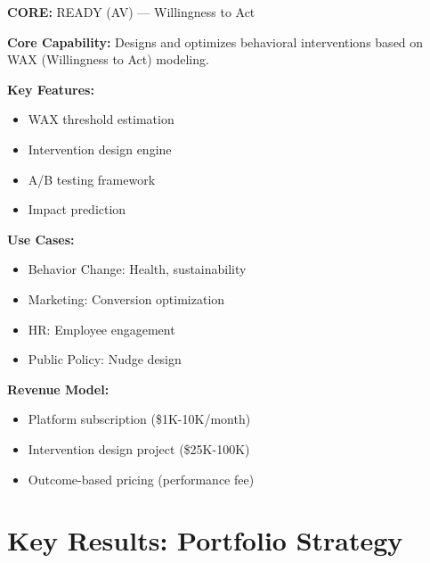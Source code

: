 \begin{tcolorbox}[colback=cyan!5!white, colframe=cyan!75!black,
    title=Product: Intervention Optimizer]

\textbf{CORE:} READY (AV) --- Willingness to Act

\textbf{Core Capability:}
Designs and optimizes behavioral interventions based on WAX (Willingness to Act) modeling.

\textbf{Key Features:}
\begin{itemize}[nosep]
\item WAX threshold estimation
\item Intervention design engine
\item A/B testing framework
\item Impact prediction
\end{itemize}

\textbf{Use Cases:}
\begin{itemize}[nosep]
\item Behavior Change: Health, sustainability
\item Marketing: Conversion optimization
\item HR: Employee engagement
\item Public Policy: Nudge design
\end{itemize}

\textbf{Revenue Model:}
\begin{itemize}[nosep]
\item Platform subscription (\$1K-10K/month)
\item Intervention design project (\$25K-100K)
\item Outcome-based pricing (performance fee)
\end{itemize}

\end{tcolorbox}


\section{Key Results: Portfolio Strategy}
\label{sec:vvv3-results}

